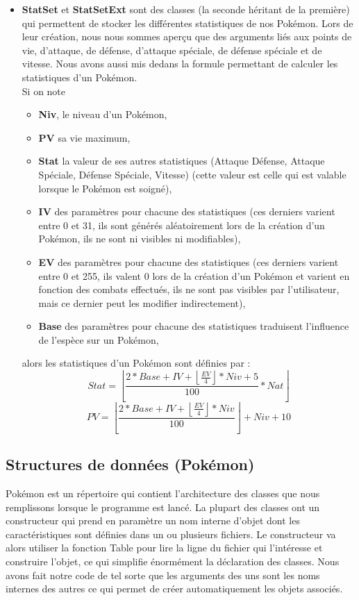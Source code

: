 \documentclass[a4paper,twoside, openany,11pt]{book}
\newcommand{\Floor}[1]{\left\lfloor #1 \right\rfloor}
\begin{document}
\begin{itemize}
\item  \textbf{StatSet} et \textbf{StatSetExt} sont des classes (la seconde héritant de la première) qui permettent de stocker les différentes statistiques de nos Pokémon. Lors de leur création, nous nous sommes aperçu que des arguments liés aux points de vie, d'attaque, de défense, d'attaque spéciale, de défense spéciale et de vitesse. Nous avons aussi mis dedans la formule permettant de calculer les statistiques d'un Pokémon. \\
Si on note
\begin{itemize}
\item \textbf{Niv}, le niveau d'un Pokémon, \\
\item \textbf{PV} sa vie maximum, \\
\item \textbf{Stat} la valeur de ses autres statistiques (Attaque Défense, Attaque Spéciale, Défense Spéciale, Vitesse) (cette valeur est celle qui est valable lorsque le Pokémon est soigné), \\
\item \textbf{IV} des paramètres pour chacune des statistiques (ces derniers varient entre 0 et 31, ils sont générés aléatoirement lors de la création d'un Pokémon, ils ne sont ni visibles ni modifiables),\\
\item \textbf{EV} des paramètres pour chacune des statistiques (ces derniers varient entre 0 et 255, ils valent 0 lors de la création d'un Pokémon et varient en fonction des combats effectués, ils ne sont pas visibles par l'utilisateur, mais ce dernier peut les modifier indirectement),\\
\item \textbf{Base} des paramètres pour chacune des statistiques traduisent l'influence de l'espèce sur un Pokémon,
\end{itemize}
alors les statistiques d'un Pokémon sont définies par :
\[
Stat = \Floor{\dfrac{2 * Base + IV + \Floor{\frac{EV}{4}} * Niv + 5}{100} * Nat}
\]
\[
PV =\Floor{\dfrac{2 * Base + IV + \Floor{\frac{EV}{4}} * Niv}{100}} + Niv + 10
\]
\end{itemize}

\subsection{Structures de données (Pokémon)}
Pokémon est un répertoire qui contient l'architecture des classes que nous remplissons lorsque le programme est lancé. La plupart des classes ont un constructeur qui prend en paramètre un nom interne d'objet dont les caractéristiques sont définies dans un ou plusieurs fichiers. Le constructeur va alors utiliser la fonction Table pour lire la ligne du fichier qui l’intéresse et construire l'objet, ce qui simplifie énormément la déclaration des classes. Nous avons fait notre code de tel sorte que les arguments des uns sont les noms internes des autres ce qui permet de créer automatiquement les objets associés. 
\end{document}
